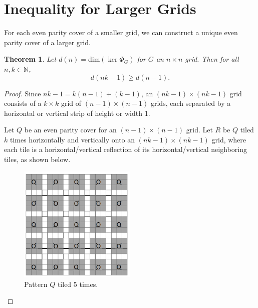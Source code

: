 \documentclass[a4paper]{article}
\newtheorem{theorem}{Theorem}
\newcommand{\N}{\mathbb{N}}
\renewcommand{\dim}[1]{\text{dim}\left( #1 \right)}
\begin{document}
	\section{Inequality for Larger Grids}
	For each even parity cover of a smaller grid, we can construct a unique even parity cover of a larger grid.
	
	\begin{theorem}\label{tiling-quiet-patterns}
		Let $d(n) = \dim{\ker{\Phi_G}}$ for $G$ an $n \times n$ grid.
		Then for all $n,k \in \N$,
		\begin{equation*}
			d(nk - 1) \geq d(n-1).
		\end{equation*}
	\end{theorem}
	\begin{proof}
		Since $nk - 1 = k(n-1) + (k-1)$, an $(nk-1) \times (nk-1)$ grid consists of a $k \times k$ grid of $(n-1) \times (n-1)$ grids, each separated by a horizontal or vertical strip of height or width 1.
	
		Let $Q$ be an even parity cover for an $(n-1) \times (n-1)$ grid.
		Let $R$ be $Q$ tiled $k$ times horizontally and vertically onto an $(nk-1) \times (nk-1)$ grid, where each tile is a horizontal/vertical reflection of its horizontal/vertical neighboring tiles, as shown below.
		
		\begin{figure}[H]
			\centering
%				
%				
%						
			\includegraphics[width=0.5\textwidth]{tiling_q.png}
			\caption{Pattern $Q$ tiled 5 times.}	
		\end{figure}
	

\end{proof}
\end{document}
